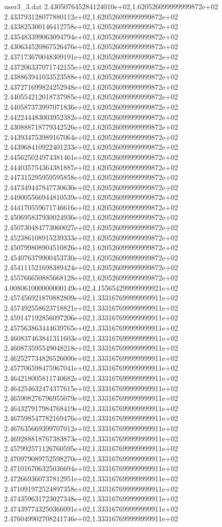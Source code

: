 \begin{filecontents}{user3_3.dat}
2.430507645284124010e+02,1.620526099999999872e+02
2.433793128077880112e+02,1.620526099999999872e+02
2.433825300146412758e+02,1.620526099999999872e+02
2.435483399063094794e+02,1.620526099999999872e+02
2.430634520867526476e+02,1.620526099999999872e+02
2.437173670048309191e+02,1.620526099999999872e+02
2.437206337071742155e+02,1.620526099999999872e+02
2.438863941033523588e+02,1.620526099999999872e+02
2.437271699824252948e+02,1.620526099999999872e+02
2.440554212018737985e+02,1.620526099999999872e+02
2.440587373997071836e+02,1.620526099999999872e+02
2.442244483003952382e+02,1.620526099999999872e+02
2.430888718779342526e+02,1.620526099999999872e+02
2.443934753989167064e+02,1.620526099999999872e+02
2.443968410922401233e+02,1.620526099999999872e+02
2.445625024974381461e+02,1.620526099999999872e+02
2.444035754364381887e+02,1.620526099999999872e+02
2.447315295959595858e+02,1.620526099999999872e+02
2.447349447847730630e+02,1.620526099999999872e+02
2.449005566944810539e+02,1.620526099999999872e+02
2.444170559671746616e+02,1.620526099999999872e+02
2.450695837930024936e+02,1.620526099999999872e+02
2.450730484773060027e+02,1.620526099999999872e+02
2.452386108915239333e+02,1.620526099999999872e+02
2.450799808904510826e+02,1.620526099999999872e+02
2.454076379900453730e+02,1.620526099999999872e+02
2.454111521698389424e+02,1.620526099999999872e+02
2.455766650885668128e+02,1.620526099999999872e+02
4.008061000000000149e+02,4.155654299999999921e+02
2.457456921870882809e+02,1.333167699999999911e+02
2.457492558623718821e+02,1.333167699999999911e+02
2.459147192856097206e+02,1.333167699999999911e+02
2.457563863444639765e+02,1.333167699999999911e+02
2.460837463841311603e+02,1.333167699999999911e+02
2.460873595549048218e+02,1.333167699999999911e+02
2.462527734826526000e+02,1.333167699999999911e+02
2.457706598475967041e+02,1.333167699999999911e+02
2.464218005811740682e+02,1.333167699999999911e+02
2.464254632474377615e+02,1.333167699999999911e+02
2.465908276796955079e+02,1.333167699999999911e+02
2.464327917984768419e+02,1.333167699999999911e+02
2.467598547782169476e+02,1.333167699999999911e+02
2.467635669399707012e+02,1.333167699999999911e+02
2.469288818767383873e+02,1.333167699999999911e+02
2.457992571126760595e+02,1.333167699999999911e+02
2.470979089752598270e+02,1.333167699999999911e+02
2.471016706325036694e+02,1.333167699999999911e+02
2.472669360737812951e+02,1.333167699999999911e+02
2.471091972524897358e+02,1.333167699999999911e+02
2.474359631723027348e+02,1.333167699999999911e+02
2.474397743250366091e+02,1.333167699999999911e+02
2.476049902708241746e+02,1.333167699999999911e+02

\end{filecontents}
